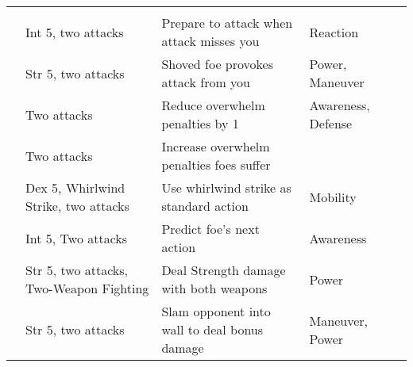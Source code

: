 {\begin{longtabu}{>{\lcol}p{10em} >{\lcol}p{15em} >{\lcol}X >{\lcol}p{6em} >{\lcol}p{3em}}
        \midrule
         &  &  &  &  \\
         & Int 5, two attacks & Prepare to attack when attack misses you & Reaction &  \\
         & Str 5, two attacks & Shoved foe provokes attack from you & Power, Maneuver &  \\
         & Two attacks & Reduce overwhelm penalties by 1 & Awareness, Defense &  \\
         & Two attacks & Increase overwhelm penalties foes suffer & \x &  \\
         & Dex 5, Whirlwind Strike, two attacks & Use whirlwind strike as standard action & Mobility &  \\
         & Int 5, Two attacks & Predict foe's next action & Awareness &  \\
         & Str 5, two attacks, Two-Weapon Fighting & Deal Strength damage with both weapons & Power &  \\
         & Str 5, two attacks & Slam opponent into wall to deal bonus damage & Maneuver, Power &  \\


\end{longtabu}}
